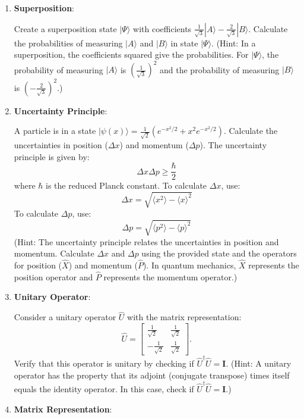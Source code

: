 \documentclass[a4paper]{article}
\begin{document}
\begin{enumerate}
    \item \textbf{Superposition}:
    
    Create a superposition state $|\Psi\rangle$ with coefficients $\frac{1}{\sqrt{3}}|A\rangle - \frac{2}{\sqrt{3}}|B\rangle$. Calculate the probabilities of measuring $|A\rangle$ and $|B\rangle$ in state $|\Psi\rangle$. (Hint: In a superposition, the coefficients squared give the probabilities. For $|\Psi\rangle$, the probability of measuring $|A\rangle$ is $\left(\frac{1}{\sqrt{3}}\right)^2$ and the probability of measuring $|B\rangle$ is $\left(-\frac{2}{\sqrt{3}}\right)^2$.)

    \item \textbf{Uncertainty Principle}:
    
    A particle is in a state $|\psi(x)\rangle = \frac{1}{\sqrt{2}}(e^{-x^2/2} + x^2e^{-x^2/2})$. Calculate the uncertainties in position ($\Delta x$) and momentum ($\Delta p$). The uncertainty principle is given by:
    \[ \Delta x \Delta p \geq \frac{\hbar}{2} \]
    where $\hbar$ is the reduced Planck constant. To calculate $\Delta x$, use:
    \[ \Delta x = \sqrt{\langle x^2 \rangle - \langle x \rangle^2} \]
    To calculate $\Delta p$, use:
    \[ \Delta p = \sqrt{\langle p^2 \rangle - \langle p \rangle^2} \]
    (Hint: The uncertainty principle relates the uncertainties in position and momentum. Calculate $\Delta x$ and $\Delta p$ using the provided state and the operators for position ($\hat{X}$) and momentum ($\hat{P}$). In quantum mechanics, $\hat{X}$ represents the position operator and $\hat{P}$ represents the momentum operator.)

    \item \textbf{Unitary Operator}:
    
    Consider a unitary operator $\hat{U}$ with the matrix representation:
    \[
    \hat{U} = \begin{bmatrix}
    \frac{1}{\sqrt{2}} & \frac{1}{\sqrt{2}} \\
    -\frac{1}{\sqrt{2}} & \frac{1}{\sqrt{2}}
    \end{bmatrix}.
    \]
    Verify that this operator is unitary by checking if $\hat{U}^\dagger\hat{U} = \mathbf{I}$. (Hint: A unitary operator has the property that its adjoint (conjugate transpose) times itself equals the identity operator. In this case, check if $\hat{U}^\dagger\hat{U} = \mathbf{I}$.)

    \item \textbf{Matrix Representation}:
    

\end{enumerate}
\end{document}
